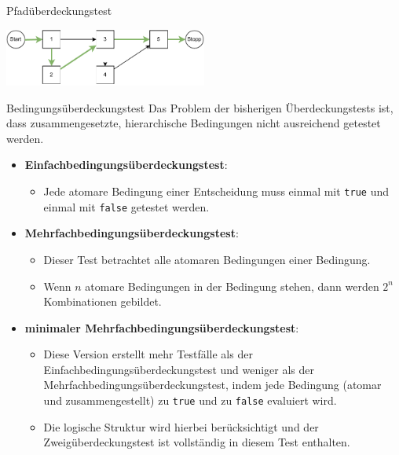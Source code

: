 \begin{example}{Pfadüberdeckungstest}
\begin{itemize}
              \vspace{1em}
              \begin{center}
                  \includegraphics[width=0.5\textwidth]{includes/figures/example_kontrollfluss_pfad_4.pdf}
              \end{center}
    \end{itemize}
\end{example}

\begin{defi}{Bedingungsüberdeckungstest}
    Das Problem der bisherigen Überdeckungstests ist, dass zusammengesetzte, hierarchische Bedingungen nicht ausreichend getestet werden.

    \begin{itemize}
        \item \textbf{Einfachbedingungsüberdeckungstest}:
              \begin{itemize}
                  \item Jede atomare Bedingung einer Entscheidung muss einmal mit \texttt{true} und einmal mit \texttt{false} getestet werden.
              \end{itemize}
        \item \textbf{Mehrfachbedingungsüberdeckungstest}:
              \begin{itemize}
                  \item Dieser Test betrachtet alle atomaren Bedingungen einer Bedingung.
                  \item Wenn $n$ atomare Bedingungen in der Bedingung stehen, dann werden $2^{n}$ Kombinationen gebildet.
              \end{itemize}
        \item \textbf{minimaler Mehrfachbedingungsüberdeckungstest}:
              \begin{itemize}
                  \item Diese Version erstellt mehr Testfälle als der Einfachbedingungsüberdeckungstest und weniger als der Mehrfachbedingungsüberdeckungstest, indem jede Bedingung (atomar und zusammengestellt) zu \texttt{true} und zu \texttt{false} evaluiert wird.
                  \item Die logische Struktur wird hierbei berücksichtigt und der Zweigüberdeckungstest ist vollständig in diesem Test enthalten.
              \end{itemize}
    \end{itemize}
\end{defi}

